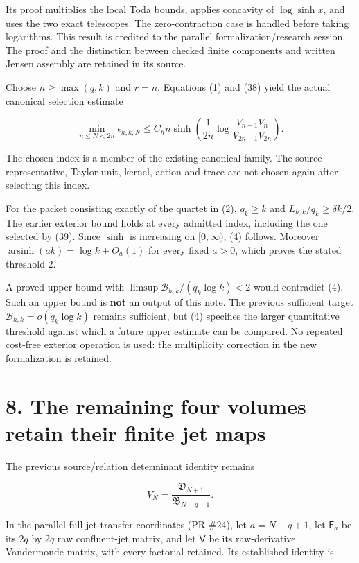 Its proof multiplies the local Toda bounds, applies concavity of
\(\log\sinh x\), and uses the two exact telescopes. The zero-contraction
case is handled before taking logarithms. This result is credited to the
parallel formalization/research session. The proof and the distinction
between checked finite components and written Jensen assembly are
retained in its source.

Choose \(n\ge\max(q,k)\) and \(r=n\). Equations (1) and (38) yield the
actual canonical selection estimate

\[
 \boxed{
 \min_{n\le N<2n}\epsilon_{h,k,N}
 \le C_hn\sinh\!\left(\frac1{2n}
                 \log\frac{V_{n-1}V_n}{V_{2n-1}V_{2n}}\right).
 }                                                                     \tag{39}
\]

The chosen index is a member of the existing canonical family. The
source representative, Taylor unit, kernel, action and trace are not
chosen again after selecting this index.

For the packet consisting exactly of the quartet in (2), \(q_k\ge k\)
and \(L_{h,k}/q_k\ge\delta k/2\). The earlier exterior bound holds at
every admitted index, including the one selected by (39). Since
\(\sinh\) is increasing on \([0,\infty)\), (4) follows. Moreover
\(\operatorname{arsinh}(ak)=\log k+O_a(1)\) for every fixed \(a>0\),
which proves the stated threshold \(2\).

A proved upper bound with \(\limsup\mathcal B_{h,k}/(q_k\log k)<2\)
would contradict (4). Such an upper bound is \textbf{not} an output of
this note. The previous sufficient target
\(\mathcal B_{h,k}=o(q_k\log k)\) remains sufficient, but (4) specifies
the larger quantitative threshold against which a future upper estimate
can be compared. No repeated cost-free exterior operation is used: the
multiplicity correction in the new formalization is retained.

\section{8. The remaining four volumes retain their finite jet
maps}\label{the-remaining-four-volumes-retain-their-finite-jet-maps}

The previous source/relation determinant identity remains

\[
 V_N=\frac{\mathfrak D_{N+1}}{\mathfrak B_{N-q+1}}.
                                                                         \tag{40}
\]

In the parallel full-jet transfer coordinates (PR \#24), let
\(a=N-q+1\), let \(\mathsf F_a\) be its \(2q\) by \(2q\) raw
confluent-jet matrix, and let \(\mathsf V\) be its raw-derivative
Vandermonde matrix, with every factorial retained. Its established
identity is

